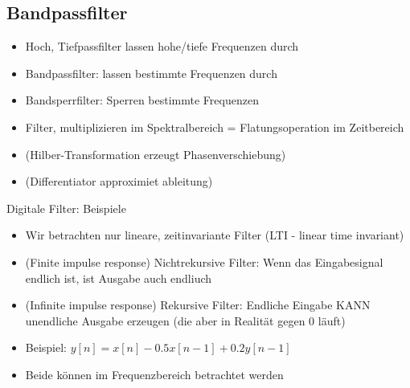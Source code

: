 \documentclass[a4paper,10pt,oneside]{article}
\begin{document}
\subsection{Bandpassfilter}
\begin{itemize}
	\item Hoch, Tiefpassfilter lassen hohe/tiefe Frequenzen durch
	\item Bandpassfilter: lassen bestimmte Frequenzen durch
	\item Bandsperrfilter: Sperren bestimmte Frequenzen
	\item Filter, multiplizieren im Spektralbereich = Flatungsoperation im Zeitbereich
	\item (Hilber-Transformation erzeugt Phasenverschiebung)
	\item (Differentiator approximiet ableitung)
\end{itemize}

Digitale Filter: Beispiele
\begin{itemize}
	\item Wir betrachten nur lineare, zeitinvariante Filter (LTI - linear time invariant)
	\item (Finite impulse response) Nichtrekursive Filter: Wenn das Eingabesignal endlich ist, ist Ausgabe auch endliuch
	\item (Infinite impulse response) Rekursive Filter: Endliche Eingabe KANN unendliche Ausgabe erzeugen (die aber in Realität gegen 0 läuft)
	\item Beispiel: $y[n] = x[n] - 0.5 x[n-1] + 0.2y[n-1]$
	\item Beide können im Frequenzbereich betrachtet werden
\end{itemize}
\end{document}
